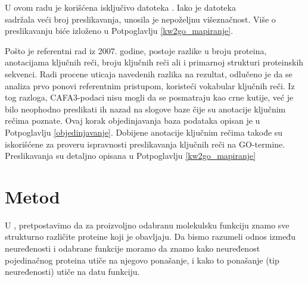 U ovom radu je korišćena isključivo datoteka . Iako je
datoteka \\  sadržala veći broj preslikavanja, unosila je
nepoželjnu višeznačnost.  Više o preslikavanju biće izloženo u Potpoglavlju
\ref{kw2go_mapiranje}.

Pošto je referentni rad iz 2007. godine, postoje razlike u broju proteina,
anotacijama ključnih reči, broju ključnih reči ali i primarnoj strukturi proteinskih
sekvenci.  Radi procene uticaja navedenih razlika na rezultat, odlučeno je da se
analiza prvo ponovi referentnim pristupom, koristeći vokabular ključnih reči.
Iz tog razloga, CAFA3-podaci nisu mogli da se posmatraju kao crne kutije, već
je bilo neophodno preslikati ih nazad na slogove baze \swissprot čije su anotacije 
ključnim rečima poznate. Ovaj korak objedinjavanja baza podataka opisan je u
Potpoglavlju \ref{objedinjavanje}. Dobijene anotacije ključnim rečima takođe su
iskorišćene za proveru ispravnosti preslikavanja ključnih reči na GO-termine.
Preslikavanja su detaljno opisana u Potpoglavlju \ref{kw2go_mapiranje}



\section {Metod}


U , pretpostavimo da za proizvoljno odabranu molekulsku
funkciju znamo sve strukturno različite proteine koji je obavljaju.  Da bismo
razumeli odnos između neuređenosti i odabrane funkcije moramo da znamo kako
neuređenost pojedinačnog proteina utiče na njegovo ponašanje, i kako to
ponašanje (tip neuređenosti) utiče na datu funkciju.

